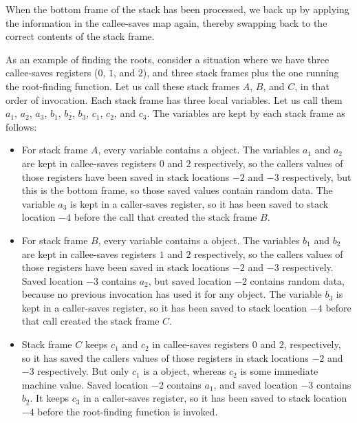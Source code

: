 When the bottom frame of the stack has been processed, we back up by
applying the information in the callee-saves map again, thereby
swapping back to the correct contents of the stack frame.

As an example of finding the roots, consider a situation where we have
three callee-saves registers ($0$, $1$, and $2$), and three stack
frames plus the one running the root-finding function.  Let us call
these stack frames $A$, $B$, and $C$, in that order of invocation.
Each stack frame has three local variables.  Let us call them $a_1$,
$a_2$, $a_3$, $b_1$, $b_2$, $b_3$, $c_1$, $c_2$, and $c_3$.  The
variables are kept by each stack frame as follows:

\begin{itemize}
\item For stack frame $A$, every variable contains a \commonlisp{}
  object.  The variables $a_1$ and $a_2$ are kept in callee-saves
  registers $0$ and $2$ respectively, so the callers values of those
  registers have been saved in stack locations $-2$ and $-3$
  respectively, but this is the bottom frame, so those saved values
  contain random data.  The variable $a_3$ is kept in a caller-saves
  register, so it has been saved to stack location $-4$ before the
  call that created the stack frame $B$.
\item For stack frame $B$, every variable contains a \commonlisp{}
  object.  The variables $b_1$ and $b_2$ are kept in callee-saves
  registers $1$ and $2$ respectively, so the callers values of those
  registers have been saved in stack locations $-2$ and $-3$
  respectively.  Saved location $-3$ contains $a_2$, but saved
  location $-2$ contains random data, because no previous invocation
  has used it for any \commonlisp{} object.  The variable $b_3$ is
  kept in a caller-saves register, so it has been saved to stack
  location $-4$ before that call created the stack frame $C$.
\item Stack frame $C$ keeps $c_1$ and $c_2$ in callee-saves registers
  $0$ and $2$, respectively, so it has saved the callers values of
  those registers in stack locations $-2$ and $-3$ respectively.  But
  only $c_1$ is a \commonlisp{} object, whereas $c_2$ is some immediate
  machine value.  Saved location $-2$ contains $a_1$, and saved
  location $-3$ contains $b_2$.  It keeps $c_3$ in a caller-saves
  register, so it has been saved to stack location $-4$ before the
  root-finding function is invoked.
\end{itemize}

